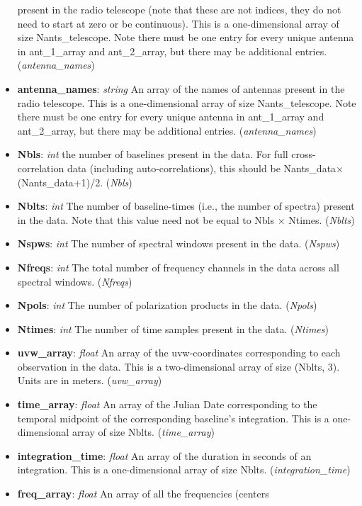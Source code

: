 \documentclass[11pt, oneside]{article}
\begin{document}
\begin{itemize}
  present in the radio telescope (note that these are not indices, they do not need to start at zero
  or be continuous). This is a one-dimensional array of size
  Nants\_telescope. Note there must be one entry for every unique antenna in
  ant\_1\_array and ant\_2\_array, but there may be additional
  entries. (\textit{antenna\_names})
\item \textbf{antenna\_names}: \textit{string} An array of the names of antennas
  present in the radio telescope. This is a one-dimensional array of size
  Nants\_telescope. Note there must be one entry for every unique antenna in
  ant\_1\_array and ant\_2\_array, but there may be additional
  entries. (\textit{antenna\_names})
\item \textbf{Nbls}: \textit{int} the number of baselines present in the
  data. For full cross-correlation data (including auto-correlations), this
  should be Nants\_data$\times$(Nants\_data+1)/2. (\textit{Nbls})
\item \textbf{Nblts}: \textit{int} The number of baseline-times (i.e., the
  number of spectra) present in the data. Note that this value need not be equal
  to Nbls $\times$ Ntimes. (\textit{Nblts})
\item \textbf{Nspws}: \textit{int} The number of spectral windows present in the
  data. (\textit{Nspws})
\item \textbf{Nfreqs}: \textit{int} The total number of frequency channels in
  the data across all spectral windows. (\textit{Nfreqs})
\item \textbf{Npols}: \textit{int} The number of polarization products in the
  data. (\textit{Npols})
\item \textbf{Ntimes}: \textit{int} The number of time samples present in the
  data. (\textit{Ntimes})
\item \textbf{uvw\_array}: \textit{float} An array of the uvw-coordinates
  corresponding to each observation in the data. This is a two-dimensional array of
  size (Nblts, 3). Units are in meters. (\textit{uvw\_array})
\item \textbf{time\_array}: \textit{float} An array of the Julian Date
  corresponding to the temporal midpoint of the corresponding baseline's
  integration. This is a one-dimensional array of size
  Nblts. (\textit{time\_array})
\item \textbf{integration\_time}: \textit{float} An array of the duration in
  seconds of an integration. This is a one-dimensional array of size
  Nblts. (\textit{integration\_time})
\item \textbf{freq\_array}: \textit{float} An array of all the frequencies (centers

\end{itemize}
\end{document}
